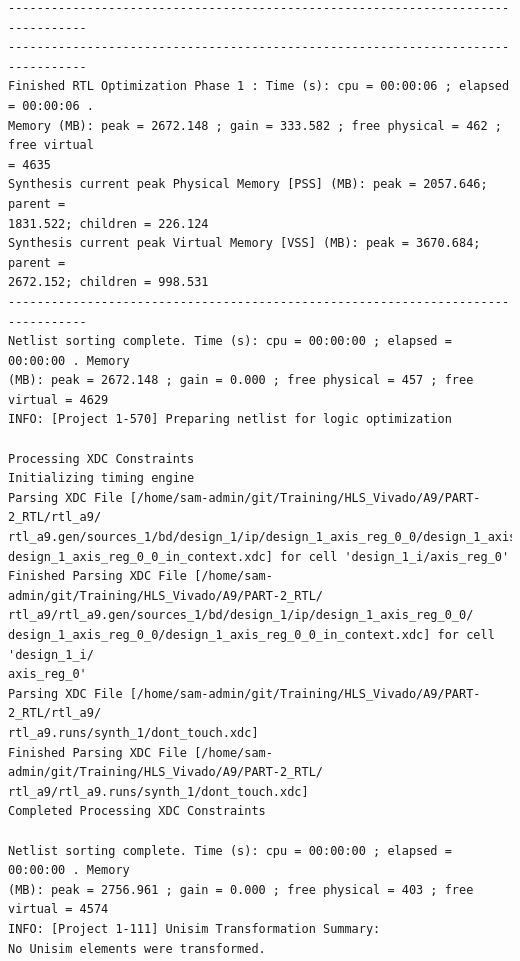 \documentclass{article}
\begin{document}
\begin{lstlisting}
---------------------------------------------------------------------------------
---------------------------------------------------------------------------------
Finished RTL Optimization Phase 1 : Time (s): cpu = 00:00:06 ; elapsed = 00:00:06 . 
Memory (MB): peak = 2672.148 ; gain = 333.582 ; free physical = 462 ; free virtual 
= 4635
Synthesis current peak Physical Memory [PSS] (MB): peak = 2057.646; parent = 
1831.522; children = 226.124
Synthesis current peak Virtual Memory [VSS] (MB): peak = 3670.684; parent = 
2672.152; children = 998.531
---------------------------------------------------------------------------------
Netlist sorting complete. Time (s): cpu = 00:00:00 ; elapsed = 00:00:00 . Memory 
(MB): peak = 2672.148 ; gain = 0.000 ; free physical = 457 ; free virtual = 4629
INFO: [Project 1-570] Preparing netlist for logic optimization

Processing XDC Constraints
Initializing timing engine
Parsing XDC File [/home/sam-admin/git/Training/HLS_Vivado/A9/PART-2_RTL/rtl_a9/
rtl_a9.gen/sources_1/bd/design_1/ip/design_1_axis_reg_0_0/design_1_axis_reg_0_0/
design_1_axis_reg_0_0_in_context.xdc] for cell 'design_1_i/axis_reg_0'
Finished Parsing XDC File [/home/sam-admin/git/Training/HLS_Vivado/A9/PART-2_RTL/
rtl_a9/rtl_a9.gen/sources_1/bd/design_1/ip/design_1_axis_reg_0_0/
design_1_axis_reg_0_0/design_1_axis_reg_0_0_in_context.xdc] for cell 'design_1_i/
axis_reg_0'
Parsing XDC File [/home/sam-admin/git/Training/HLS_Vivado/A9/PART-2_RTL/rtl_a9/
rtl_a9.runs/synth_1/dont_touch.xdc]
Finished Parsing XDC File [/home/sam-admin/git/Training/HLS_Vivado/A9/PART-2_RTL/
rtl_a9/rtl_a9.runs/synth_1/dont_touch.xdc]
Completed Processing XDC Constraints

Netlist sorting complete. Time (s): cpu = 00:00:00 ; elapsed = 00:00:00 . Memory 
(MB): peak = 2756.961 ; gain = 0.000 ; free physical = 403 ; free virtual = 4574
INFO: [Project 1-111] Unisim Transformation Summary:
No Unisim elements were transformed.


\end{lstlisting}
\end{document}
